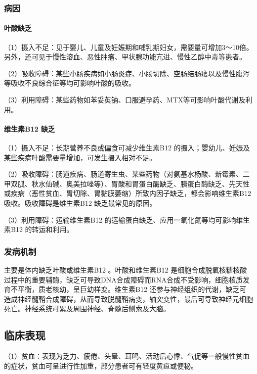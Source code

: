 \subsubsection{病因}
\paragraph{叶酸缺乏}

（1）摄入不足：见于婴儿、儿童及妊娠期和哺乳期妇女，需要量可增加3～10倍。另外，还可见于慢性溶血、恶性肿瘤、甲状腺功能亢进、慢性乙醇中毒等患者。

（2）吸收障碍：某些小肠疾病如小肠炎症、小肠切除、空肠结肠瘘以及慢性腹泻等吸收不良综合征等均可影响叶酸的吸收。

（3）利用障碍：某些药物如苯妥英钠、口服避孕药、MTX等可影响叶酸代谢及利用。
\paragraph{维生素B{12} 缺乏}

（1）摄入不足：长期营养不良或偏食可减少维生素B{12}
的摄入；婴幼儿、妊娠及某些疾病叶酸需要量增加，可发生摄入相对不足。

（2）吸收障碍：肠道疾病、肠道寄生虫、某些药物（对氨基水杨酸、新霉素、二甲双胍、秋水仙碱、奥美拉唑等）、胃酸和胃蛋白酶缺乏、胰蛋白酶缺乏、先天性或疾病（恶性贫血、胃切除、胃黏膜萎缩）所致内因子缺乏，都会影响维生素B{12}
吸收。吸收障碍是维生素B{12} 缺乏最常见的原因。

（3）利用障碍：运输维生素B{12}
的运输蛋白缺乏、应用一氧化氮等均可影响维生素B{12} 的转运和利用。

\subsubsection{发病机制}

主要是体内缺乏叶酸或维生素B{12} 。叶酸和维生素B{12}
是细胞合成脱氧核糖核酸过程中的重要辅酶，缺乏可导致DNA合成障碍而RNA合成不受影响，细胞核质发育不平衡，质老核幼，呈巨幼样变。维生素B{12}
还参与神经组织的代谢，缺乏可造成神经髓鞘合成障碍，从而导致脱髓鞘病变，轴突变性，最后可导致神经元细胞死亡。神经系统可累及周围神经、脊髓后侧索及大脑。

\subsection{临床表现}

（1）贫血：表现为乏力、疲倦、头晕、耳鸣、活动后心悸、气促等一般慢性贫血的症状，贫血可呈进行性加重，部分患者可有轻度黄疸或便秘。

